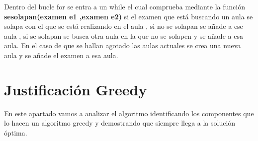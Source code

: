 \documentclass[11pt,openany]{book}
\begin{document}
Dentro del bucle for se entra a un while el cual comprueba mediante la función \textbf{sesolapan(examen e1 ,examen e2)}
si el examen que está buscando un aula se solapa con el que se está realizando en el aula , si no se solapan se añade a 
ese aula , si se solapan se busca otra aula en la que no se solapen y se añade a esa aula. En el caso de que se hallan agotado
las aulas actuales se crea una nueva aula y se añade el examen a esa aula.

\section{Justificación Greedy}

En este apartado vamos a analizar el algoritmo identificando los componentes que lo hacen un algoritmo greedy 
y demostrando que siempre llega a la solución óptima.
\end{document}
